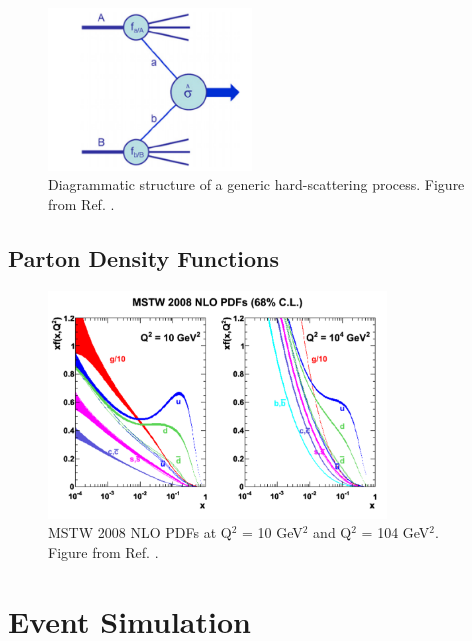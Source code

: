 \begin{figure}[h]
\begin{center}
    \includegraphics[width=0.48\textwidth]{figures/simul/ppcoll}
\end{center}
 \caption{Diagrammatic structure of a generic hard-scattering process. Figure from Ref. \cite{Campbell:2006wx}.}
  \label{fig:sim:pp}
\end{figure}

\subsection{Parton Density Functions}

\begin{figure}[h]
\begin{center}
    \includegraphics[width=0.8\textwidth]{figures/simul/pdf}
\end{center}
 \caption{MSTW 2008 NLO PDFs at Q$^2$ = 10 GeV$^2$ and Q$^2$ = 104 GeV$^2$. Figure from Ref. \cite{Martin:2009iq}.}
  \label{fig:sim:pp}
\end{figure}


\section{Event Simulation}
\label{sec:eventsimul}

